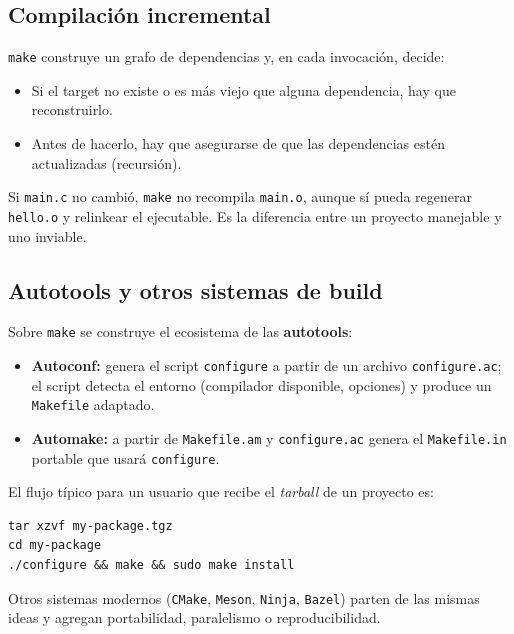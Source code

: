 \documentclass[11pt,a4paper]{article}
\begin{document}
\subsection{Compilación incremental}

\texttt{make} construye un grafo de dependencias y, en cada
invocación, decide:

\begin{itemize}[leftmargin=*]
    \item Si el target no existe o es más viejo que alguna
        dependencia, hay que reconstruirlo.
    \item Antes de hacerlo, hay que asegurarse de que las
        dependencias estén actualizadas (recursión).
\end{itemize}

\begin{idea}
Si \texttt{main.c} no cambió, \texttt{make} no recompila
\texttt{main.o}, aunque sí pueda regenerar \texttt{hello.o} y
relinkear el ejecutable. Es la diferencia entre un proyecto
manejable y uno inviable.
\end{idea}

\subsection{Autotools y otros sistemas de build}

Sobre \texttt{make} se construye el ecosistema de las
\textbf{autotools}:

\begin{itemize}[leftmargin=*]
    \item \textbf{Autoconf:} genera el script \texttt{configure} a
        partir de un archivo \texttt{configure.ac}; el script detecta
        el entorno (compilador disponible, opciones) y produce un
        \texttt{Makefile} adaptado.
    \item \textbf{Automake:} a partir de \texttt{Makefile.am} y
        \texttt{configure.ac} genera el \texttt{Makefile.in} portable
        que usará \texttt{configure}.
\end{itemize}

El flujo típico para un usuario que recibe el \emph{tarball} de un
proyecto es:

\begin{lstlisting}
tar xzvf my-package.tgz
cd my-package
./configure && make && sudo make install
\end{lstlisting}

Otros sistemas modernos (\texttt{CMake}, \texttt{Meson}, \texttt{Ninja},
\texttt{Bazel}) parten de las mismas ideas y agregan portabilidad,
paralelismo o reproducibilidad.
\end{document}
